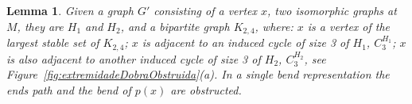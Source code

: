 \documentclass[a4paper,11pt]{article}
\newtheorem{lema}[theorem]{Lemma}
\begin{document}


%

%


%



\begin{lema}\label{lem:obstrucao}
Given a graph $ G'$ consisting of a vertex $ x $, two isomorphic graphs at $ M $, they are $ H_1 $ and $ H_2 $, and a bipartite graph $ K_{2,4}$, where: $ x $ is a vertex of the largest stable set of $ K_{2,4} $; $x $ is adjacent to an induced cycle of size 3 of $ H_1 $, $ C_3^{H_1} $; $x $ is also adjacent to another induced cycle of size 3 of $ H_2 $, $ C_3^{H_2}$, see Figure~\ref{fig:extremidadeDobraObstruida}(a). In a single bend representation the ends path and the bend of $p(x) $ are obstructed.%
\end{lema}
\end{document}
